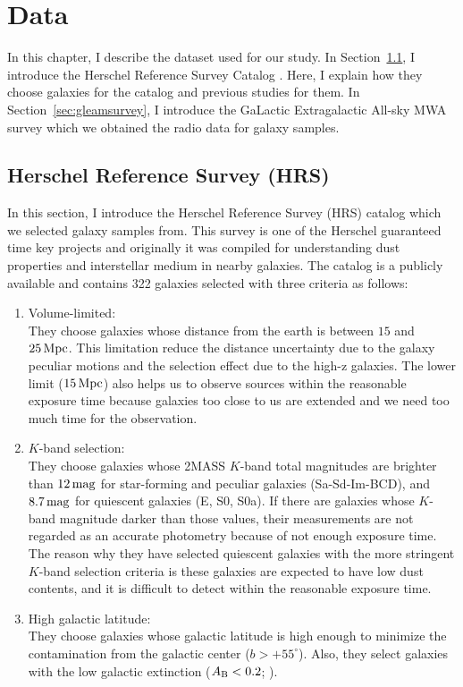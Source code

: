\chapter{Data}\label{chap:data}
\begin{chapabstract}

In this chapter, I describe the dataset used for our study.
In Section~\ref{sec:HerschelReferenceSurvey}, I introduce the Herschel Reference Survey Catalog \citep{Boselli2010}.
Here, I explain how they choose galaxies for the catalog and previous studies for them.
In Section~\ref{sec:gleamsurvey}, I introduce the GaLactic Extragalactic All-sky MWA survey which we obtained the radio data for galaxy samples.

\end{chapabstract}

\section{Herschel Reference Survey (HRS)}\label{sec:HerschelReferenceSurvey}
In this section, I introduce the Herschel Reference Survey (HRS) catalog \citep{Boselli2010} which we selected galaxy samples from.
This survey is one of the Herschel guaranteed time key projects and originally it was compiled for understanding dust properties and interstellar medium in nearby galaxies.
The catalog is a publicly available and contains 322 galaxies selected with three criteria as follows:

\begin{enumerate}
    \item Volume-limited:\\
        They choose galaxies whose distance from the earth is between $15$ and $25\,\mathrm{Mpc}$.
        This limitation reduce the distance uncertainty due to the galaxy peculiar motions and the selection effect due to the high-z galaxies.
        The lower limit ($15\,\mathrm{Mpc}$) also helps us to observe sources within the reasonable exposure time because galaxies too close to us are extended and we need too much time for the observation.
    \item $K$-band selection:\\
        They choose galaxies whose 2MASS $K$-band total magnitudes are brighter than $12\,\mathrm{mag}$ for star-forming and peculiar galaxies (Sa-Sd-Im-BCD), and $8.7\,\mathrm{mag}$ for quiescent galaxies (E, S0, S0a).
        If there are galaxies whose $K$-band magnitude darker than those values, their measurements are not regarded as an accurate photometry because of not enough exposure time.
        The reason why they have selected quiescent galaxies with the more stringent $K$-band selection criteria is these galaxies are expected to have low dust contents, and it is difficult to detect within the reasonable exposure time.
    \item High galactic latitude:\\
        They choose galaxies whose galactic latitude is high enough to minimize the contamination from the galactic center ($b > +55^{\circ}$).
        Also, they select galaxies with the low galactic extinction ($A_{\mathrm{B}} < 0.2$; \citealt{Schlegel1998}).
\end{enumerate}


